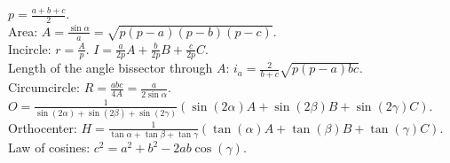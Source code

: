 \documentclass[a4paper, twocolumn, 10pt]{report}
\begin{document}
$p=\frac{a+b+c}{2}$.\\
Area: $A=\frac{\sin\alpha}{a}=\sqrt{p(p-a)(p-b)(p-c)}$.\\
Incircle: $r=\frac{A}{p}$. $I=\frac{a}{2p}A+\frac{b}{2p}B+\frac{c}{2p}C$.\\
Length of the angle bissector through $A$: $i_a=\frac{2}{b+c}\sqrt{p(p-a)bc}$.\\
Circumcircle: $R=\frac{abc}{4A}=\frac{a}{2\sin\alpha}$. $O=\frac{1}{\sin(2\alpha)+\sin(2\beta)+\sin(2\gamma)}(\sin(2\alpha)A+\sin(2\beta)B+\sin(2\gamma)C)$.\\
Orthocenter: $H=\frac{1}{\tan\alpha+\tan\beta+\tan\gamma}(\tan(\alpha)A+\tan(\beta)B+\tan(\gamma)C)$.\\
Law of cosines: $c^2=a^2+b^2-2ab\cos(\gamma)$.
\end{document}
